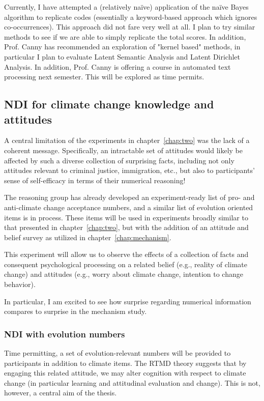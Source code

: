Currently, I have attempted a (relatively na\"ive) application of the na\"ive
Bayes algorithm to replicate codes (essentially a keyword-based approach which
ignores co-occurrences). This approach did not fare very well at all. I plan to
try similar methods to see if we are able to simply replicate the total scores.
In addition, Prof. Canny has recommended an exploration of "kernel based"
methods, in particular I plan to evaluate Latent Semantic Analysis and Latent
Dirichlet Analysis. In addition, Prof. Canny is offering a course in automated
text processing next semester.  This will be explored as time permits.

\subsection{NDI for climate change knowledge and attitudes}

A central limitation of the experiments in chapter~\ref{chap:two} was the lack
of a coherent message. Specifically, an intractable set of attitudes
would likely be affected by such a diverse collection of surprising facts,
including not only attitudes relevant to criminal justice, immigration, etc.,
but also to participants' sense of self-efficacy in terms of their numerical
reasoning!

The reasoning group has already developed an experiment-ready list of pro- and
anti-climate change acceptance numbers, and a similar list of evolution oriented
items is in process. These items will be used in experiments broadly similar to
that presented in chapter~\ref{chap:two}, but with the addition of an attitude
and belief survey as utilized in chapter~\ref{chap:mechanism}.

This experiment will allow us to observe the effects of a collection of facts
and consequent psychological processing on a related belief (e.g., reality of
climate change) and attitudes (e.g., worry about climate change, intention to
change behavior).

In particular, I am excited to see how surprise regarding numerical information
compares to surprise in the mechanism study.

\subsubsection{NDI with evolution numbers}

Time permitting, a set of evolution-relevant numbers will be provided to
participants in addition to climate items. The RTMD theory suggests that by
engaging this related attitude, we may alter cognition with respect to climate
change (in particular learning and attitudinal evaluation and change). This is
not, however, a central aim of the thesis.

